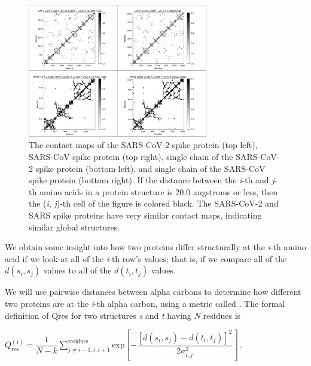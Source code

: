 \begin{figure}[h]
	\centering
	\mySfFamily
	\includegraphics[width = 0.7\textwidth]{../images/Contact.png}
	\caption{The contact maps of the SARS-CoV-2 spike protein (top left), SARS-CoV spike protein (top right), single chain of the SARS-CoV-2 spike protein (bottom left), and single chain of the SARS-CoV spike protein (bottom right). If the distance between the \textit{i}-th and \textit{j}-th amino acids in a protein structure is 20.0 angstroms or less, then the (\textit{i}, \textit{j})-th cell of the figure is colored black. The SARS-CoV-2 and SARS spike proteins have very similar contact maps, indicating similar global structures.}
	\label{fig:Contact}
\end{figure}

\begin{qbox}\end{qbox}

We obtain some insight into how two proteins differ structurally at the \textit{i}-th amino acid if we look at all of the \textit{i}-th row's values; that is, if we compare all of the $d(s_{i}, s_{j})$ values to all of the $d(t_{i}, t_{j})$ values.

We will use pairwise distances between alpha carbons to determine how different two proteins are at the \textit{i}-th alpha carbon, using a metric called .  The formal definition of Qres for two structures \textit{s} and \textit{t} having \textit{N} residues is

\begin{center}
$Q_{\text{res}}^{(i)} = \dfrac{1}{N-k} \sum^{\text{residues}}_{j\neq i-1,i,i+1} \textrm{exp}[-\dfrac{[d(s_i,s_j)-d(t_i,t_j)]^2}{2\sigma^2_{i,j}}]\, .$
\end{center}

